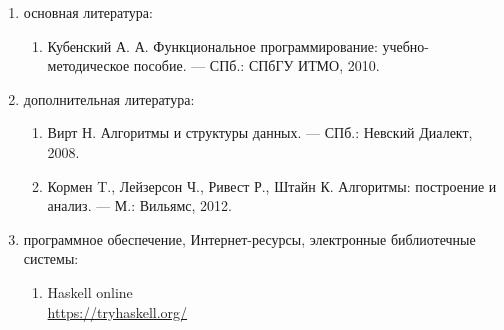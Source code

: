 \begin{enumerate}
\item основная литература:
	\begin{enumerate}
		\item \label{funk} Кубенский А. А. Функциональное программирование: учебно-методическое пособие. — СПб.: СПбГУ ИТМО, 2010. 
	\end{enumerate}
\item дополнительная литература:
	\begin{enumerate}[resume]
		\item \label{wirth} Вирт Н. Алгоритмы и структуры данных. — СПб.: Невский Диалект, 2008. 
		\item \label{kormen} Кормен T., Лейзерсон Ч., Ривест Р., Штайн К. Алгоритмы: построение и анализ. — М.: Вильямс, 2012.
	\end{enumerate}
\item программное обеспечение, Интернет-ресурсы, электронные библиотечные системы:
	\begin{enumerate}[resume]
		\item \label{haskell} Haskell online\\ \url{https://tryhaskell.org/}
	\end{enumerate}
\end{enumerate}






